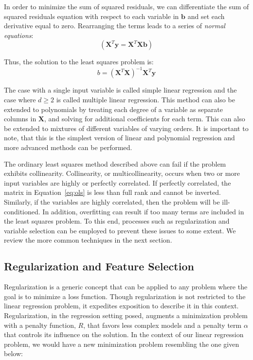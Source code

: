 In order to minimize the sum of squared residuals, we can differentiate the sum of squared residuals equation with respect to each variable in $\mathbf{b}$ and set each derivative equal to zero.
%
Rearranging the terms leads to a series of \emph{normal equations}:
\begin{equation}
(\mathbf{X}^T\mathbf{y}= \mathbf{X}^T\mathbf{X}\mathbf{b})
\end{equation}

Thus, the solution to the least squares problem is:
\begin{equation}
b = (\mathbf{X}^T \mathbf{X})^{-1} \mathbf{X}^T \mathbf{y}
\label{eq:ols}
\end{equation}

The case with a single input variable is called simple linear regression and the case where $d\geq 2$ is called multiple linear regression.
%
This method can also be extended to polynomials by treating each degree of a variable as separate columns in $\mathbf{X}$, and solving for additional coefficients for each term.
%
This can also be extended to mixtures of different variables of varying orders.
%
It is important to note, that this is the simplest version of linear and polynomial regression and more advanced methods can be performed.

The ordinary least squares method described above can fail if the problem exhibits collinearity.
%
Collinearity, or multicollinearity, occurs when two or more input variables are highly or perfectly correlated.
%
If perfectly correlated, the matrix in Equation~\ref{eq:ols} is less than full rank and cannot be inverted.
%
Similarly, if the variables are highly correlated, then the problem will be ill-conditioned.
%
In addition, overfitting can result if too many terms are included in the least squares problem.
%
To this end, processes such as regularization and variable selection can be employed to prevent these issues to some extent.
%
We review the more common techniques in the next section.

\subsection{Regularization and Feature Selection}
\label{sec:regularization}
Regularization is a generic concept that can be applied to any problem where the goal is to minimize a loss function.
%
Though regularization is not restricted to the linear regression problem, it expedites exposition to describe it in this context.
%
Regularization, in the regression setting posed, augments a minimization problem with a penalty function, $R$, that favors less complex models and a penalty term $\alpha$ that controls its influence on the solution.
%
In the context of our linear regression problem, we would have a new minimization problem resembling the one given below:

